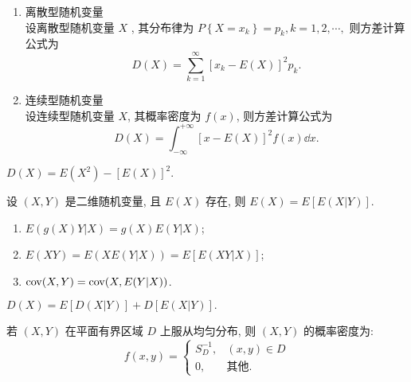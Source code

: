 \begin{enumerate}[label=(\arabic{*})]
    \item 离散型随机变量\\
    设离散型随机变量 $ X $ , 其分布律为 $P\left\{X=x_{k}\right\}=p_{k}, k=1,2, \cdots,$
    则方差计算公式为
    $$D(X)=\sum_{k=1}^{\infty}\left[x_{k}-E(X)\right]^{2} p_{k}.$$
    \item 连续型随机变量\\
    设连续型随机变量 $ X $, 其概率密度为 $ f(x) $, 则方差计算公式为
    $$D(X)=\int_{-\infty}^{+\infty}[x-E(X)]^{2} f(x) \dd  x .$$
\end{enumerate}

\begin{theorem}[方差与期望的联系]
    $D(X)=E\left(X^{2}\right)-[E(X)]^{2} .$
\end{theorem}

\begin{theorem}[重期望公式]
    设 $(X,Y)$ 是二维随机变量, 且 $E(X)$ 存在, 则 
    $E(X)=E[E(X|Y)].$
\end{theorem}

\begin{inference}
    \begin{enumerate}[label=(\arabic{*})]
        \item $E(g(X)Y|X)=g(X)E(Y|X)$;
        \item $E(XY)=E(XE(Y|X))=E[E(XY|X)]$;
        \item $\mathrm{cov}(X,Y)=\mathrm{cov}(X,E(Y|X))$.
    \end{enumerate}
\end{inference}

\begin{theorem}[全方差公式]
    $D(X)=E[D(X|Y)]+D[E(X|Y)].$
\end{theorem}

\begin{theorem}[二维均匀分布的随机变量的概率密度]
    若 $(X,Y)$ 在平面有界区域 $D$ 上服从均匀分布, 则 $(X,Y)$ 的概率密度为:
    $$f(x,y)=\begin{cases}
            S_D^{-1}, & (x,y)\in D   \\
            0,        & \text{其他}.
        \end{cases}$$
\end{theorem}

